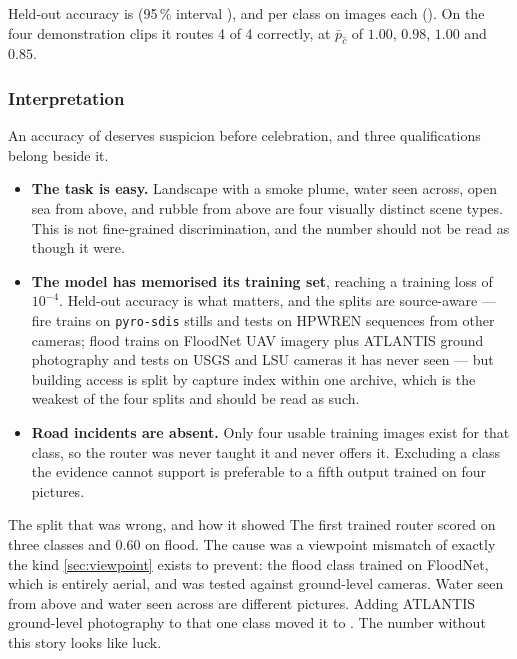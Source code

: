 Held-out accuracy is \RouterAccuracy{} (95\,\% interval \RouterAccuracyCI),
and per class \RouterPerClass{} on \RouterPerClassImages{} images each
(\RouterPerClassCI). On the four demonstration clips it routes 4 of 4
correctly, at $\bar{p}_{\hat{c}}$ of $1.00$, $0.98$, $1.00$ and $0.85$.

\subsubsection{Interpretation}

An accuracy of \RouterAccuracy{} deserves suspicion before celebration,
and three qualifications belong beside it.

\begin{itemize}
  \item \textbf{The task is easy.} Landscape with a smoke plume, water seen
        across, open sea from above, and rubble from above are four visually
        distinct scene types. This is not fine-grained discrimination, and the
        number should not be read as though it were.
  \item \textbf{The model has memorised its training set}, reaching a training
        loss of $10^{-4}$. Held-out accuracy is what matters, and the splits
        are source-aware — fire trains on \texttt{pyro-sdis} stills and tests
        on HPWREN sequences from other cameras; flood trains on FloodNet UAV
        imagery plus ATLANTIS ground photography and tests on USGS and LSU
        cameras it has never seen — but building access is split by capture
        index within one archive, which is the weakest of the four splits and
        should be read as such.
  \item \textbf{Road incidents are absent.} Only four usable training images
        exist for that class, so the router was never taught it and never
        offers it. Excluding a class the evidence cannot support is preferable
        to a fifth output trained on four pictures.
\end{itemize}

\begin{recorded}{The split that was wrong, and how it showed}
The first trained router scored \RouterAccuracy{} on three classes and $0.60$
on flood. The cause was a viewpoint mismatch of exactly the kind
\cref{sec:viewpoint} exists to prevent: the flood class trained on FloodNet,
which is entirely aerial, and was tested against ground-level cameras. Water
seen from above and water seen across are different pictures. Adding ATLANTIS
ground-level photography to that one class moved it to
\RouterPerClass{}. The number without this story looks like luck.
\end{recorded}

